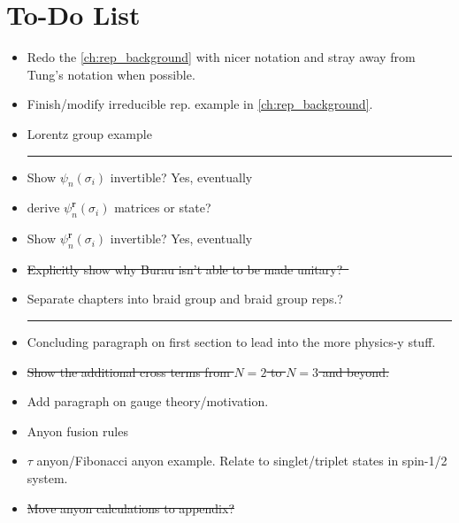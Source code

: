 \chapter{To-Do List}\label{ch:todo}

\begin{itemize}
    \item Redo the \cref{ch:rep_background} with nicer notation and stray away from Tung's notation when possible.
    \item Finish/modify irreducible rep. example in \cref{ch:rep_background}.
    \item Lorentz group example
    
    \begin{center}\rule{.85\textwidth}{0.65pt}\end{center}
    
    \item Show $\psi_n(\sigma_i)$ invertible? Yes, eventually
    \item derive $\psi_n^\textbf{r}(\sigma_i)$ matrices or state?
    \item Show $\psi_n^\textbf{r}(\sigma_i)$ invertible? Yes, eventually
    \item \sout{Explicitly show why Burau isn't able to be made unitary?~\cite{Delaney2016}}
    \item Separate chapters into braid group and braid group reps.?
    
    \begin{center}\rule{.85\textwidth}{0.65pt}\end{center}
    
    \item Concluding paragraph on first section to lead into the more physics-y stuff.
    \item \sout{Show the additional cross terms from $N=2$ to $N=3$ and beyond.}
    \item Add paragraph on gauge theory/motivation.
    \item Anyon fusion rules
    \item $\tau$ anyon/Fibonacci anyon example. Relate to singlet/triplet states in spin-1/2 system.
    \item \sout{Move anyon calculations to appendix?}
\end{itemize}
